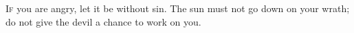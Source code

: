 \lettrine[loversize=0.15,lines=2]{I}{f} you are angry, let it be without sin. The sun must not go down on your wrath; do not give the devil a chance to work on you.
